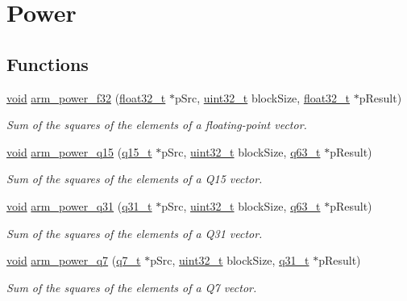 \hypertarget{group__power}{\section{Power}
\label{group__power}
}
\subsection*{Functions}
\begin{DoxyCompactItemize}
\item 
\hyperlink{group___n_a_m_e_ga18028b8badbf1ea7e704ccac3c488e82}{void} \hyperlink{group__power_ga993c00dd7f661d66bdb6e58426e893aa}{arm\-\_\-power\-\_\-f32} (\hyperlink{arm__math_8h_a4611b605e45ab401f02cab15c5e38715}{float32\-\_\-t} $\ast$p\-Src, \hyperlink{stdint_8h_a435d1572bf3f880d55459d9805097f62}{uint32\-\_\-t} block\-Size, \hyperlink{arm__math_8h_a4611b605e45ab401f02cab15c5e38715}{float32\-\_\-t} $\ast$p\-Result)
\begin{DoxyCompactList}\small\item\em Sum of the squares of the elements of a floating-\/point vector. \end{DoxyCompactList}\item 
\hyperlink{group___n_a_m_e_ga18028b8badbf1ea7e704ccac3c488e82}{void} \hyperlink{group__power_ga7050c04b7515e01a75c38f1abbaf71ba}{arm\-\_\-power\-\_\-q15} (\hyperlink{arm__math_8h_ab5a8fb21a5b3b983d5f54f31614052ea}{q15\-\_\-t} $\ast$p\-Src, \hyperlink{stdint_8h_a435d1572bf3f880d55459d9805097f62}{uint32\-\_\-t} block\-Size, \hyperlink{arm__math_8h_a5aea1cb12fc02d9d44c8abf217eaa5c6}{q63\-\_\-t} $\ast$p\-Result)
\begin{DoxyCompactList}\small\item\em Sum of the squares of the elements of a Q15 vector. \end{DoxyCompactList}\item 
\hyperlink{group___n_a_m_e_ga18028b8badbf1ea7e704ccac3c488e82}{void} \hyperlink{group__power_ga0b93d31bb5b5ed214c2b94d8a7744cd2}{arm\-\_\-power\-\_\-q31} (\hyperlink{arm__math_8h_adc89a3547f5324b7b3b95adec3806bc0}{q31\-\_\-t} $\ast$p\-Src, \hyperlink{stdint_8h_a435d1572bf3f880d55459d9805097f62}{uint32\-\_\-t} block\-Size, \hyperlink{arm__math_8h_a5aea1cb12fc02d9d44c8abf217eaa5c6}{q63\-\_\-t} $\ast$p\-Result)
\begin{DoxyCompactList}\small\item\em Sum of the squares of the elements of a Q31 vector. \end{DoxyCompactList}\item 
\hyperlink{group___n_a_m_e_ga18028b8badbf1ea7e704ccac3c488e82}{void} \hyperlink{group__power_gaf969c85c5655e3d72d7b99ff188f92c9}{arm\-\_\-power\-\_\-q7} (\hyperlink{arm__math_8h_ae541b6f232c305361e9b416fc9eed263}{q7\-\_\-t} $\ast$p\-Src, \hyperlink{stdint_8h_a435d1572bf3f880d55459d9805097f62}{uint32\-\_\-t} block\-Size, \hyperlink{arm__math_8h_adc89a3547f5324b7b3b95adec3806bc0}{q31\-\_\-t} $\ast$p\-Result)
\begin{DoxyCompactList}\small\item\em Sum of the squares of the elements of a Q7 vector. \end{DoxyCompactList}\end{DoxyCompactItemize}


